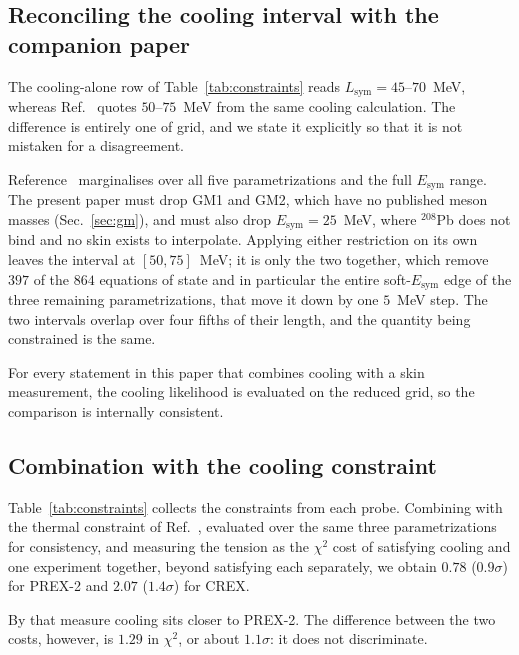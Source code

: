 \documentclass[aps,prc,twocolumn,showpacs,superscriptaddress,floatfix]{revtex4-2}
\newcommand{\Esym}{E_{\mathrm{sym}}}
\newcommand{\Lsym}{L_{\mathrm{sym}}}
\begin{document}
\subsection{Reconciling the cooling interval with the companion paper}
\label{sec:reconcile}

The cooling-alone row of Table~\ref{tab:constraints} reads
$\Lsym = 45$--$70$~MeV, whereas Ref.~\cite{PaperI} quotes $50$--$75$~MeV from
the same cooling calculation. The difference is entirely one of grid, and we
state it explicitly so that it is not mistaken for a disagreement.

Reference~\cite{PaperI} marginalises over all five parametrizations and the
full $\Esym$ range. The present paper must drop GM1 and GM2, which have no
published meson masses (Sec.~\ref{sec:gm}), and must also drop
$\Esym = 25$~MeV, where $^{208}$Pb does not bind and no skin exists to
interpolate. Applying either restriction on its own leaves the interval at
$[50,75]$~MeV; it is only the two together, which remove $397$ of the $864$
equations of state and in particular the entire soft-$\Esym$ edge of the three
remaining parametrizations, that move it down by one $5$~MeV step. The two
intervals overlap over four fifths of their length, and the quantity being
constrained is the same.

For every statement in this paper that combines cooling with a skin
measurement, the cooling likelihood is evaluated on the reduced grid, so the
comparison is internally consistent.

\subsection{Combination with the cooling constraint}

Table~\ref{tab:constraints} collects the constraints from each probe.
Combining with the thermal constraint of Ref.~\cite{PaperI}, evaluated over the
same three parametrizations for consistency, and measuring the
tension as the $\chi^2$ cost of satisfying cooling and one experiment together,
beyond satisfying each separately, we obtain $0.78$ ($0.9\sigma$) for PREX-2 and
$2.07$ ($1.4\sigma$) for CREX.

By that measure cooling sits closer to PREX-2. The difference between the two
costs, however, is $1.29$ in $\chi^2$, or about $1.1\sigma$: it does not
discriminate.
\end{document}
